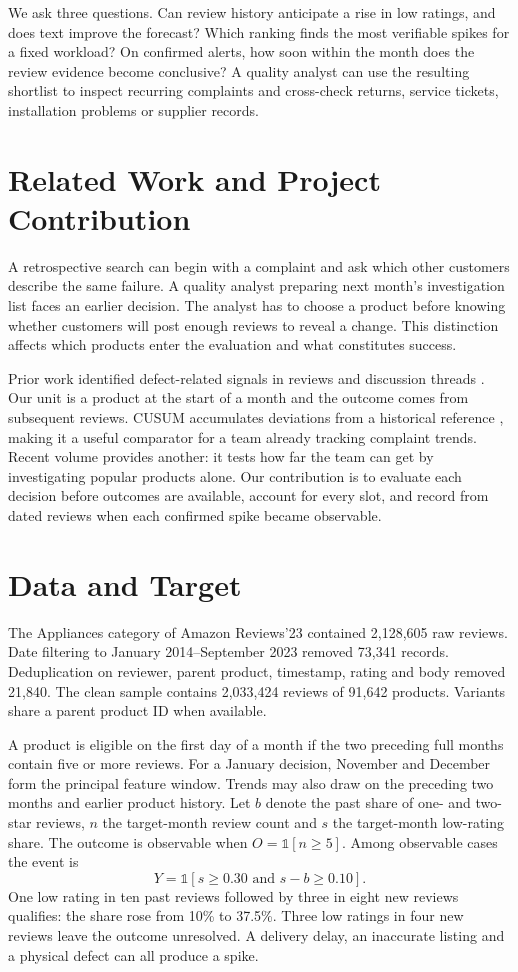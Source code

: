 \documentclass[conference]{IEEEtran}
\begin{document}
We ask three questions. Can review history anticipate a rise in low ratings, and does text improve the forecast? Which ranking finds the most verifiable spikes for a fixed workload? On confirmed alerts, how soon within the month does the review evidence become conclusive? A quality analyst can use the resulting shortlist to inspect recurring complaints and cross-check returns, service tickets, installation problems or supplier records.

\section{Related Work and Project Contribution}
A retrospective search can begin with a complaint and ask which other customers describe the same failure. A quality analyst preparing next month's investigation list faces an earlier decision. The analyst has to choose a product before knowing whether customers will post enough reviews to reveal a change. This distinction affects which products enter the evaluation and what constitutes success.

Prior work identified defect-related signals in reviews and discussion threads \cite{abbas,abrahams,winkler}. Our unit is a product at the start of a month and the outcome comes from subsequent reviews. CUSUM accumulates deviations from a historical reference \cite{page}, making it a useful comparator for a team already tracking complaint trends. Recent volume provides another: it tests how far the team can get by investigating popular products alone. Our contribution is to evaluate each decision before outcomes are available, account for every slot, and record from dated reviews when each confirmed spike became observable.

\section{Data and Target}
The Appliances category of Amazon Reviews'23 \cite{hou,amazon} contained 2,128,605 raw reviews. Date filtering to January 2014--September 2023 removed 73,341 records. Deduplication on reviewer, parent product, timestamp, rating and body removed 21,840. The clean sample contains 2,033,424 reviews of 91,642 products. Variants share a parent product ID when available.

A product is eligible on the first day of a month if the two preceding full months contain five or more reviews. For a January decision, November and December form the principal feature window. Trends may also draw on the preceding two months and earlier product history. Let $b$ denote the past share of one- and two-star reviews, $n$ the target-month review count and $s$ the target-month low-rating share. The outcome is observable when $O=\mathbb{1}[n\ge 5]$. Among observable cases the event is
\begin{equation}
Y=\mathbb{1}\left[s\ge 0.30 \text{ and } s-b\ge 0.10\right].
\end{equation}
One low rating in ten past reviews followed by three in eight new reviews qualifies: the share rose from 10\% to 37.5\%. Three low ratings in four new reviews leave the outcome unresolved. A delivery delay, an inaccurate listing and a physical defect can all produce a spike.
\end{document}
